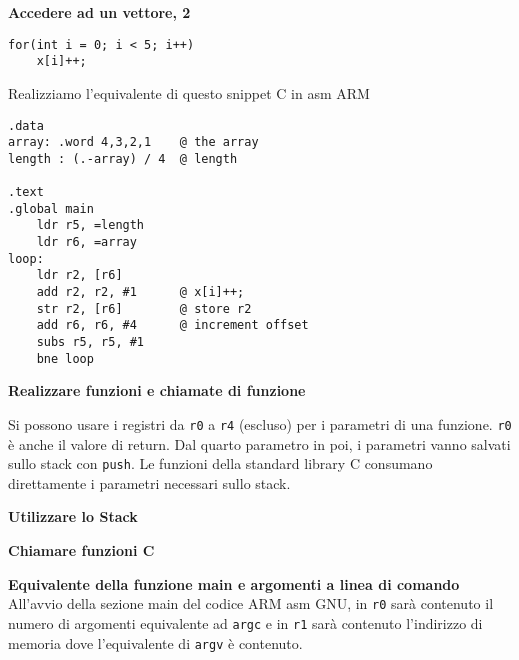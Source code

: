 \begin{exmp}
\textbf{Accedere ad un vettore, 2}
\begin{lstlisting}
for(int i = 0; i < 5; i++)
	x[i]++;
\end{lstlisting}

Realizziamo l'equivalente di questo snippet C in asm ARM


\begin{lstlisting}[style=armn]
.data
array: .word 4,3,2,1    @ the array
length : (.-array) / 4	@ length

.text
.global main
	ldr r5, =length
	ldr r6, =array
loop:
	ldr r2, [r6]
	add r2, r2, #1		@ x[i]++;
	str r2, [r6]		@ store r2
	add r6, r6, #4 		@ increment offset
	subs r5, r5, #1
	bne loop
\end{lstlisting}
\end{exmp}

\begin{exmp}
\textbf{Realizzare funzioni e chiamate di funzione}

Si possono usare i registri da \verb|r0| a \verb|r4| (escluso) per i parametri di una funzione.
\verb|r0| è anche il valore di return.
Dal quarto parametro in poi, i parametri vanno salvati sullo stack con \verb|push|.
Le funzioni della standard library C consumano direttamente i parametri necessari sullo stack.
\end{exmp}

\begin{defn}
	\textbf{Utilizzare lo Stack}
\end{defn}

\begin{exmp}
\textbf{Chiamare funzioni C}
\end{exmp}

\begin{exmp}
	\textbf{Equivalente della funzione main e argomenti a linea di comando}
	All'avvio della sezione main del codice ARM asm GNU, in
	\verb|r0| sarà contenuto il numero di argomenti equivalente ad \verb|argc|
	e in \verb|r1| sarà contenuto l'indirizzo di memoria dove l'equivalente di \verb|argv| è contenuto.
\end{exmp}


